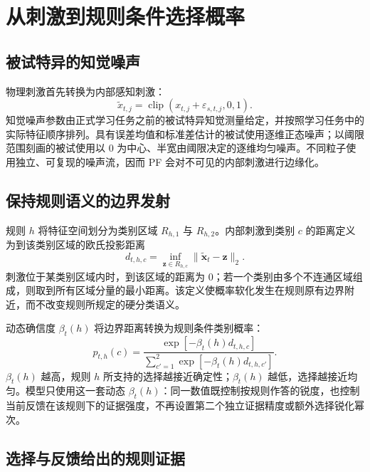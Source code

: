 \documentclass[12pt]{article}
\begin{document}
\section{从刺激到规则条件选择概率}

\subsection{被试特异的知觉噪声}

物理刺激首先转换为内部感知刺激：
\begin{equation}
\widetilde x_{t,j}
=\operatorname{clip}(x_{t,j}+\varepsilon_{s,t,j},0,1).
\label{eq:perception}
\end{equation}
知觉噪声参数由正式学习任务之前的被试特异知觉测量给定，并按照学习任务中的实际特征顺序排列。具有误差均值和标准差估计的被试使用逐维正态噪声；以阈限范围刻画的被试使用以 0 为中心、半宽由阈限决定的逐维均匀噪声。不同粒子使用独立、可复现的噪声流，因而 PF 会对不可见的内部刺激进行边缘化。

\subsection{保持规则语义的边界发射}

规则 $h$ 将特征空间划分为类别区域 $R_{h,1}$ 与 $R_{h,2}$。内部刺激到类别 $c$ 的距离定义为到该类别区域的欧氏投影距离
\begin{equation}
d_{t,h,c}
=\inf_{\bm z\in R_{h,c}}
\lVert\widetilde{\bm x}_t-\bm z\rVert_2.
\label{eq:boundary-distance}
\end{equation}
刺激位于某类别区域内时，到该区域的距离为 0；若一个类别由多个不连通区域组成，则取到所有区域分量的最小距离。该定义使概率软化发生在规则原有边界附近，而不改变规则所规定的硬分类语义。

动态确信度 $\beta_t(h)$ 将边界距离转换为规则条件类别概率：
\begin{equation}
p_{t,h}(c)
=
\frac{\exp[-\beta_t(h)d_{t,h,c}]}
{\sum_{c'=1}^{2}\exp[-\beta_t(h)d_{t,h,c'}]}.
\label{eq:rule-emission}
\end{equation}
$\beta_t(h)$ 越高，规则 $h$ 所支持的选择越接近确定性；$\beta_t(h)$ 越低，选择越接近均匀。模型只使用这一套动态 $\beta_t(h)$：同一数值既控制按规则作答的锐度，也控制当前反馈在该规则下的证据强度，不再设置第二个独立证据精度或额外选择锐化幂次。

\subsection{选择与反馈给出的规则证据}
\end{document}
